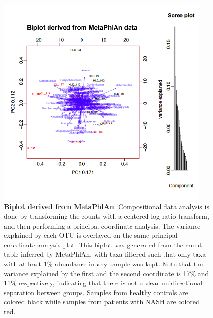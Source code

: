 \begin{figure}[h]
\begin{center}
\includegraphics[width=0.95\textwidth]{metaphlan_biplot.png}
\caption{\textbf{Biplot derived from MetaPhlAn.} Compositional data analysis is done by transforming the counts with a centered log ratio transform, and then performing a principal coordinate analysis. The variance explained by each OTU is overlayed on the same principal coordinate analysis plot. This biplot was generated from the count table inferred by MetaPhlAn, with taxa filtered such that only taxa with at least 1\% abundance in any sample was kept. Note that the variance explained by the first and the second coordinate is 17\% and 11\% respectively, indicating that there is not a clear unidirectional separation between groups. Samples from healthy controls are colored black while samples from patients with NASH are colored red.}
\end{center}
\label{nafld_metaphlan_biplot}
\end{figure}


